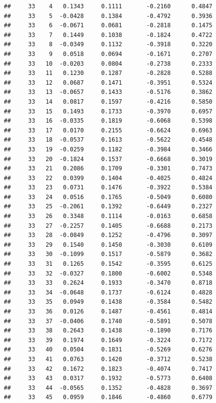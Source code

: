 \documentclass[
]{article}
\begin{document}
\begin{verbatim}
##     33    4   0.1343     0.1111       -0.2160      0.4847  
##     33    5  -0.0428     0.1384       -0.4792      0.3936  
##     33    6  -0.0671     0.0681       -0.2818      0.1475  
##     33    7   0.1449     0.1038       -0.1824      0.4722  
##     33    8  -0.0349     0.1132       -0.3918      0.3220  
##     33    9   0.0518     0.0694       -0.1671      0.2707  
##     33   10  -0.0203     0.0804       -0.2738      0.2333  
##     33   11   0.1230     0.1287       -0.2828      0.5288  
##     33   12   0.0687     0.1471       -0.3951      0.5324  
##     33   13  -0.0657     0.1433       -0.5176      0.3862  
##     33   14   0.0817     0.1597       -0.4216      0.5850  
##     33   15   0.1493     0.1733       -0.3970      0.6957  
##     33   16  -0.0335     0.1819       -0.6068      0.5398  
##     33   17   0.0170     0.2155       -0.6624      0.6963  
##     33   18  -0.0537     0.1613       -0.5622      0.4548  
##     33   19  -0.0259     0.1182       -0.3984      0.3466  
##     33   20  -0.1824     0.1537       -0.6668      0.3019  
##     33   21   0.2086     0.1709       -0.3301      0.7473  
##     33   22   0.0399     0.1404       -0.4025      0.4824  
##     33   23   0.0731     0.1476       -0.3922      0.5384  
##     33   24   0.0516     0.1765       -0.5049      0.6080  
##     33   25  -0.2061     0.1392       -0.6449      0.2327  
##     33   26   0.3348     0.1114       -0.0163      0.6858  
##     33   27  -0.2257     0.1405       -0.6688      0.2173  
##     33   28  -0.0849     0.1252       -0.4796      0.3097  
##     33   29   0.1540     0.1450       -0.3030      0.6109  
##     33   30  -0.1099     0.1517       -0.5879      0.3682  
##     33   31   0.1265     0.1542       -0.3595      0.6125  
##     33   32  -0.0327     0.1800       -0.6002      0.5348  
##     33   33   0.2624     0.1933       -0.3470      0.8718  
##     33   34  -0.0648     0.1737       -0.6124      0.4828  
##     33   35   0.0949     0.1438       -0.3584      0.5482  
##     33   36   0.0126     0.1487       -0.4561      0.4814  
##     33   37  -0.0406     0.1740       -0.5891      0.5078  
##     33   38   0.2643     0.1438       -0.1890      0.7176  
##     33   39   0.1974     0.1649       -0.3224      0.7172  
##     33   40   0.0504     0.1831       -0.5269      0.6276  
##     33   41   0.0763     0.1420       -0.3712      0.5238  
##     33   42   0.1672     0.1823       -0.4074      0.7417  
##     33   43   0.0317     0.1932       -0.5773      0.6408  
##     33   44  -0.0565     0.1352       -0.4828      0.3697  
##     33   45   0.0959     0.1846       -0.4860      0.6779  

\end{verbatim}
\end{document}
